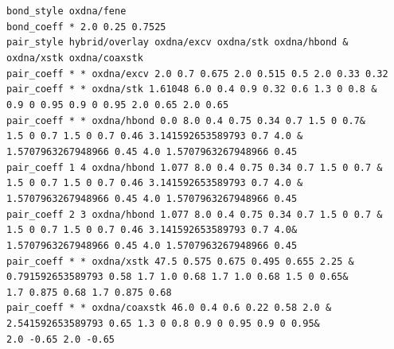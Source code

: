 \documentclass[12pt,onecolumn]{article}
\begin{document}
\smallskip
\texttt{bond\_style oxdna/fene\\
bond\_coeff * 2.0 0.25 0.7525\\
pair\_style hybrid/overlay oxdna/excv oxdna/stk oxdna/hbond \&\\
\hspace*{0.75cm}oxdna/xstk oxdna/coaxstk\\
pair\_coeff * * oxdna/excv   2.0 0.7 0.675 2.0 0.515 0.5 2.0 0.33 0.32\\
pair\_coeff * * oxdna/stk    1.61048 6.0 0.4 0.9 0.32 0.6 1.3 0 0.8 \&\\
\hspace*{0.75cm}0.9 0 0.95 0.9 0 0.95 2.0 0.65 2.0 0.65\\
pair\_coeff * * oxdna/hbond  0.0 8.0 0.4 0.75 0.34 0.7 1.5 0 0.7\&\\
\hspace*{0.75cm}1.5 0 0.7 1.5 0 0.7 0.46 3.141592653589793 0.7 4.0 \&\\
\hspace*{0.75cm}1.5707963267948966 0.45 4.0 1.5707963267948966 0.45\\
pair\_coeff 1 4 oxdna/hbond  1.077 8.0 0.4 0.75 0.34 0.7 1.5 0 0.7 \&\\
\hspace*{0.75cm}1.5 0 0.7 1.5 0 0.7 0.46 3.141592653589793 0.7 4.0 \&\\
\hspace*{0.75cm}1.5707963267948966 0.45 4.0 1.5707963267948966 0.45\\
pair\_coeff 2 3 oxdna/hbond  1.077 8.0 0.4 0.75 0.34 0.7 1.5 0 0.7 \&\\
\hspace*{0.75cm}1.5 0 0.7 1.5 0 0.7 0.46 3.141592653589793 0.7 4.0\&\\
\hspace*{0.75cm}1.5707963267948966 0.45 4.0 1.5707963267948966 0.45\\
pair\_coeff * * oxdna/xstk   47.5 0.575 0.675 0.495 0.655 2.25 \&\\
\hspace*{0.75cm}0.791592653589793 0.58 1.7 1.0 0.68 1.7 1.0 0.68 1.5 0 0.65\&\\
\hspace*{0.75cm}1.7 0.875 0.68 1.7 0.875 0.68\\
pair\_coeff * * oxdna/coaxstk 46.0 0.4 0.6 0.22 0.58 2.0 \&\\
\hspace*{0.75cm}2.541592653589793 0.65 1.3 0 0.8 0.9 0 0.95 0.9 0 0.95\&\\
\hspace*{0.75cm}2.0 -0.65 2.0 -0.65\\
}
\smallskip
\end{document}
